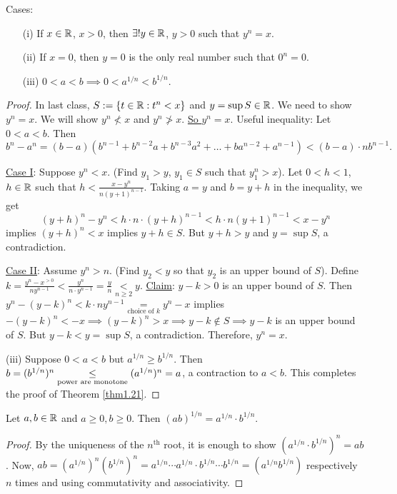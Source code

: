 \documentclass[]{article}
\begin{document}
\begin{recall}
	Cases:
	\begin{enumerate}
		\item[(i)] If $x\in \mathbb{R}$, $x>0$, then $\exists! y\in\mathbb{R}$, $y>0$ such that $y^n = x$.
		\item[(ii)] If $x=0$, then $y=0$ is the only real number such that $0^n = 0$.
		\item[(iii)] $0<a<b\implies 0<a^{1/n}<b^{1/n}$.
	\end{enumerate}
\end{recall}
\begin{proof}
	In last class, $S := \{t\in \mathbb{R}: t^n < x\}$ and $y = \sup S\in\mathbb{R}$. We need to show $y^n = x$. We will show $y^n \nless x$ and $y^n \ngtr x$. \ul{So $y^n = x$}.
	Useful inequality: Let $0<a<b$. Then $$b^n - a^n = (b-a)(b^{n-1}+b^{n-2}a + b^{n-3}a^2 + \dots + ba^{n-2} + a^{n-1}) < (b-a)\cdot nb^{n-1}.$$
	
	\ul{Case I}: Suppose $y^n < x$. (Find $y_1>y$, $y_1\in S$ such that $y_1^n > x$). Let $0<h<1$, $h\in\mathbb{R}$ such that $h< \frac{x-y^n}{n(y+1)^{n-1}}$. Taking $a = y$ and $b= y+h$ in the inequality, we get $$(y+h)^n - y^n < h\cdot n\cdot (y+h)^{n-1} < h\cdot n(y+1)^{n-1} < x-y^n$$ implies $(y+h)^n < x$ implies $y+h\in S$. But $y+h>y$ and $y=\sup S$, a contradiction.
	
	\ul{Case II}: Assume $y^n > n$. (Find $y_2 < y$ so that $y_2$ is an upper bound of $S$). Define $k = \frac{y^n - x^{>0}}{ny^{n-1}} < \frac{y^n}{n\cdot y^{n-1}} = \frac{y}{n} \underset{n\geq 2}{<} y$. 
	\ul{Claim}: $y - k > 0$ is an upper bound of $S$. 
	Then $y^n - (y-k)^n < k\cdot n y^{n-1} \underset{\text{choice of }k}{=} y^n - x$ implies $-(y-k)^n < -x \implies (y-k)^n > x \implies y-k\notin S \implies y-k$ is an upper bound of $S$. But $y-k<y = \sup S$, a contradiction. Therefore, $y^n = x$.
	
	(iii) Suppose $0<a<b$ but $a^{1/n}\geq b^{1/n}$. Then $b = (b^{1/n})^n \underset{\text{power are monotone}}{\leq} (a^{1/n})^n = a$, a contraction to $a<b$. This completes the proof of Theorem \ref{thm1.21}.
\end{proof}
\begin{corollary}
	Let $a,b\in\mathbb{R}$ and $a\geq 0,b\geq 0$. Then $(ab)^{1/n} = a^{1/n}\cdot b^{1/n}$.
\end{corollary}
\begin{proof}
	By the uniqueness of the $n^\text{th}$ root, it is enough to show $(a^{1/n}\cdot b^{1/n})^n = ab$. Now, $ab = (a^{1/n})^n (b^{1/n})^n = a^{1/n}\cdots a^{1/n}\cdot b^{1/n}\cdots b^{1/n} = (a^{1/n}b^{1/n})$ respectively $n$ times and using commutativity and associativity.
\end{proof}
\end{document}
